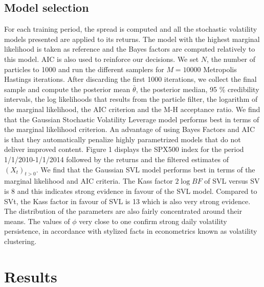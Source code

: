\documentclass[11pt,a4,twosided,singlespacing,titlepagenumber=on]{scrreprt}
\numberwithin{equation}{chapter} %
\theoremstyle{remark}
\begin{document}
\section{Model selection}
For each training period, the spread is computed and all the stochastic volatility models presented are applied to its returns. The model with the highest marginal likelihood is taken as reference and the Bayes factors are computed relatively to this model. AIC is also used to reinforce our decisions. We set $N$, the number of particles to 1000 and run the different samplers for $M = 10000$ Metropolis Hastings iterations. After discarding the first 1000 iterations, we collect the final sample and compute the posterior mean $\bar{\theta}$, the posterior median, 95 \% credibility intervals, the log likelihoods that results from the particle filter, the logarithm of the marginal likelihood, the AIC criterion and the M-H acceptance ratio. We find that the Gaussian Stochastic Volatility Leverage model performs best in terms of the marginal likelihood criterion. An advantage of using Bayes Factors and AIC is that they automatically penalize highly parametrized models that do not deliver improved content. Figure 1 displays the SPX500 index for the period 1/1/2010-1/1/2014 followed by the returns and the filtered estimates of $(X_t)_{t>0}$.
We find that the Gaussian SVL model performs best in terms of the marginal likelihood and AIC criteria. The Kass factor $2 \log BF$ of SVL versus SV is 8 and this indicates strong evidence in favour of the SVL model. Compared to SVt, the Kass factor in favour of SVL is 13 which is also very strong evidence. The distribution of the parameters are also fairly concentrated around their means. The values of $\phi$ very close to one confirm strong daily volatility persistence, in accordance with stylized facts in econometrics known as volatility clustering.

\chapter{Results}
\end{document}
